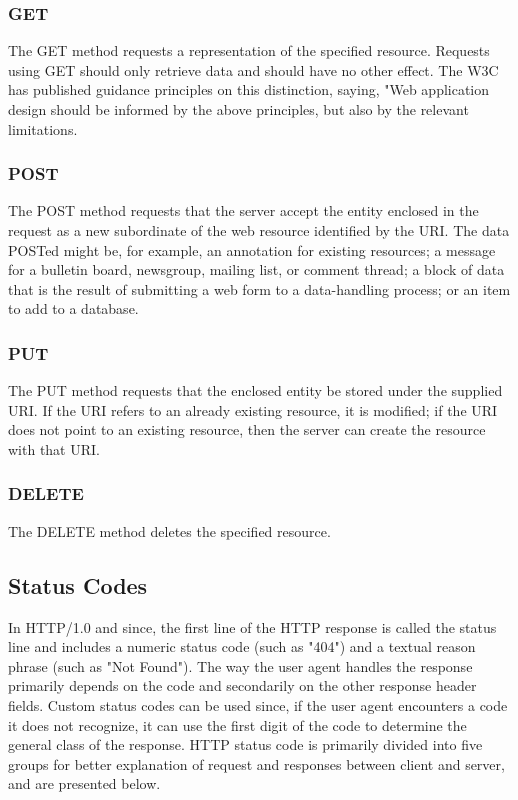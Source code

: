 \subsubsection{GET}
The GET method requests a representation of the specified resource. Requests using GET should only retrieve data and should have no other effect. The W3C has published guidance principles on this distinction, saying, "Web application design should be informed by the above principles, but also by the relevant limitations.

\subsubsection{POST}
The POST method requests that the server accept the entity enclosed in the request as a new subordinate of the web resource identified by the URI. The data POSTed might be, for example, an annotation for existing resources; a message for a bulletin board, newsgroup, mailing list, or comment thread; a block of data that is the result of submitting a web form to a data-handling process; or an item to add to a database.

\subsubsection{PUT}
The PUT method requests that the enclosed entity be stored under the supplied URI. If the URI refers to an already existing resource, it is modified; if the URI does not point to an existing resource, then the server can create the resource with that URI.

\subsubsection{DELETE}
The DELETE method deletes the specified resource.




\subsection{Status Codes}
In HTTP/1.0 and since, the first line of the HTTP response is called the status line and includes a numeric status code (such as "404") and a textual reason phrase (such as "Not Found"). The way the user agent handles the response primarily depends on the code and secondarily on the other response header fields. Custom status codes can be used since, if the user agent encounters a code it does not recognize, it can use the first digit of the code to determine the general class of the response. HTTP status code is primarily divided into five groups for better explanation of request and responses between client and server, and are presented below. 

